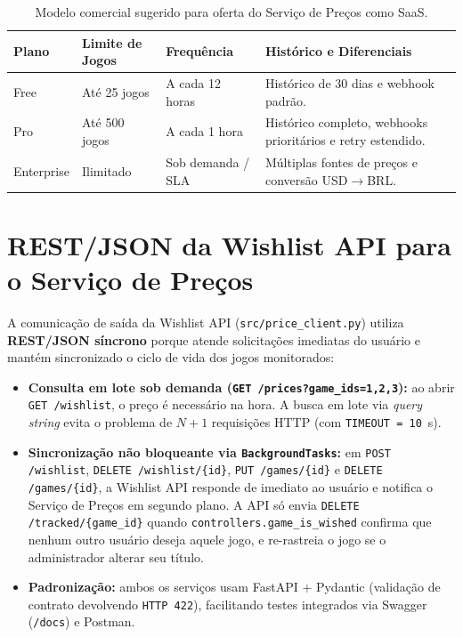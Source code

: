 \documentclass[11pt,a4paper]{article}
\begin{document}
\begin{table}[H]
\centering
\caption{Modelo comercial sugerido para oferta do Serviço de Preços como SaaS.}
\label{tab:planos}
\footnotesize
\begin{tabularx}{\textwidth}{@{}l l l Y@{}}
\toprule
\textbf{Plano} & \textbf{Limite de Jogos} & \textbf{Frequência} & \textbf{Histórico e Diferenciais} \\
\midrule
Free & Até 25 jogos & A cada 12 horas & Histórico de 30 dias e webhook padrão. \\
Pro & Até 500 jogos & A cada 1 hora & Histórico completo, webhooks prioritários e retry estendido. \\
Enterprise & Ilimitado & Sob demanda / SLA & Múltiplas fontes de preços e conversão USD$\rightarrow$BRL. \\
\bottomrule
\end{tabularx}
\end{table}

\section{REST/JSON da Wishlist API para o Serviço de Preços}

A comunicação de saída da Wishlist API (\texttt{src/price\_client.py}) utiliza \textbf{REST/JSON síncrono} porque atende solicitações imediatas do usuário e mantém sincronizado o ciclo de vida dos jogos monitorados:
\begin{itemize}
    \item \textbf{Consulta em lote sob demanda (\texttt{GET /prices?game\_ids=1,2,3}):} ao abrir \texttt{GET /wishlist}, o preço é necessário na hora. A busca em lote via \textit{query string} evita o problema de $N+1$ requisições HTTP (com \texttt{TIMEOUT = 10}~s).
    \item \textbf{Sincronização não bloqueante via \texttt{BackgroundTasks}:} em \texttt{POST /wishlist}, \texttt{DELETE /wishlist/\{id\}}, \texttt{PUT /games/\{id\}} e \texttt{DELETE /games/\{id\}}, a Wishlist API responde de imediato ao usuário e notifica o Serviço de Preços em segundo plano. A API só envia \texttt{DELETE /tracked/\{game\_id\}} quando \texttt{controllers.game\_is\_wished} confirma que nenhum outro usuário deseja aquele jogo, e re-rastreia o jogo se o administrador alterar seu título.
    \item \textbf{Padronização:} ambos os serviços usam FastAPI + Pydantic (validação de contrato devolvendo \texttt{HTTP 422}), facilitando testes integrados via Swagger (\texttt{/docs}) e Postman.
\end{itemize}
\end{document}
